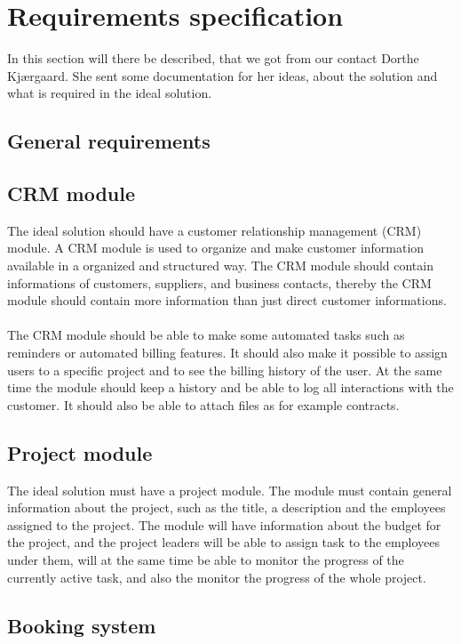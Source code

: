 \section{Requirements specification}
In this section will there be described, that we got from our contact Dorthe Kjærgaard. She sent some documentation for her ideas, about the solution and what is required in the ideal solution. 

\subsection{General requirements}

\subsection{CRM module}
The ideal solution should have a customer relationship management (CRM) module. A CRM module is used to organize and make customer information available in a organized and structured way. The CRM module should contain informations of customers, suppliers, and business contacts, thereby the CRM module should contain more information than just direct customer informations.\\
\\
The CRM module should be able to make some automated tasks such as reminders or automated billing features. It should also make it possible to assign users to a specific project and to see the billing history of the user. At the same time the module should keep a history and be able to log all interactions with the customer. It should also be able to attach files as for example contracts.

\subsection{Project module}
The ideal solution must have a project module. The module must contain general information about the project, such as the title, a description and the employees assigned to the project. The module will have information about the budget for the project, and the project leaders will be able to assign task to the employees under them, will at the same time be able to monitor the progress of the currently active task, and also the monitor the progress of the whole project.

\subsection{Booking system}

